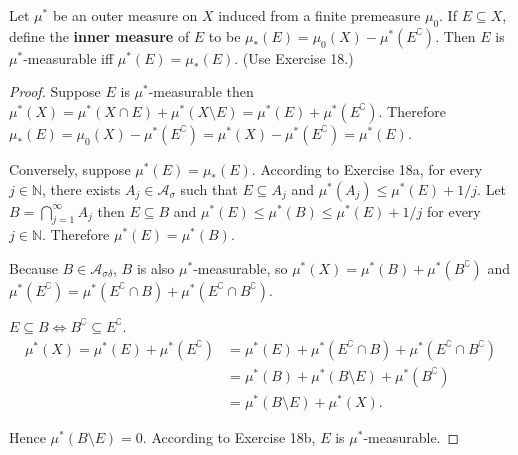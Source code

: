 \newpage

\begin{exercise}
    Let \( \mu^{\ast} \) be an outer measure on \( X \) induced from a finite premeasure \( \mu_{0} \). If \( E \subseteq X \), define the \textbf{inner measure} of \( E \) to be \( \mu_{\ast}(E) = \mu_{0}(X) - \mu^{\ast}(E^{\complement}) \). Then \( E \) is \( \mu^{\ast} \)-measurable iff \( \mu^{\ast}(E) = \mu_{\ast}(E) \). (Use Exercise 18.)
\end{exercise}

\begin{proof}
    Suppose \( E \) is \( \mu^{\ast} \)-measurable then \( \mu^{\ast}(X) = \mu^{\ast}(X \cap E) + \mu^{\ast}(X \setminus E) = \mu^{\ast}(E) + \mu^{\ast}(E^{\complement}) \). Therefore \( \mu_{\ast}(E) = \mu_{0}(X) - \mu^{\ast}(E^{\complement}) = \mu^{\ast}(X) - \mu^{\ast}(E^{\complement}) = \mu^{\ast}(E) \).

    \bigskip

    Conversely, suppose \( \mu^{\ast}(E) = \mu_{\ast}(E) \). According to Exercise 18a, for every \( j \in \mathbb{N} \), there exists \( A_{j} \in \mathcal{A}_{\sigma} \) such that \( E \subseteq A_{j} \) and \( \mu^{\ast}(A_{j}) \le \mu^{\ast}(E) + 1/j \). Let \( B = \bigcap_{j=1}^{\infty} A_{j} \) then \( E \subseteq B \) and \( \mu^{\ast}(E) \le \mu^{\ast}(B) \le \mu^{\ast}(E) + 1/j \) for every \( j \in \mathbb{N} \). Therefore \( \mu^{\ast}(E) = \mu^{\ast}(B) \).

    Because \( B \in \mathcal{A}_{\sigma\delta} \), \( B \) is also \( \mu^{\ast} \)-measurable, so \( \mu^{\ast}(X) = \mu^{\ast}(B) + \mu^{\ast}(B^{\complement}) \) and \( \mu^{\ast}(E^{\complement}) = \mu^{\ast}(E^{\complement} \cap B) + \mu^{\ast}(E^{\complement} \cap B^{\complement}) \).

    \( E \subseteq B \iff B^{\complement} \subseteq E^{\complement} \).
    \begingroup
    \allowdisplaybreaks%
    \begin{align*}
        \mu^{\ast}(X) = \mu^{\ast}(E) + \mu^{\ast}(E^{\complement}) & = \mu^{\ast}(E) + \mu^{\ast}(E^{\complement} \cap B) + \mu^{\ast}(E^{\complement} \cap B^{\complement}) \\
                                                                    & = \mu^{\ast}(B) + \mu^{\ast}(B\setminus E) + \mu^{\ast}(B^{\complement})                                \\
                                                                    & = \mu^{\ast}(B \setminus E) + \mu^{\ast}(X).
    \end{align*}
    \endgroup

    Hence \( \mu^{\ast}(B \setminus E) = 0 \). According to Exercise 18b, \( E \) is \( \mu^{\ast} \)-measurable.
\end{proof}

